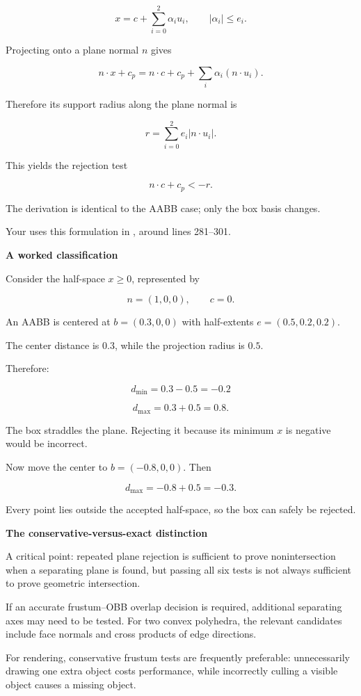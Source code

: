 \[
x=c+\sum_{i=0}^{2}\alpha_i u_i, \qquad|\alpha_i|\le e_i.
\]

Projecting onto a plane normal \(n\) gives

\[
n\cdot x+c_p = n\cdot c+c_p+ \sum_i\alpha_i(n\cdot u_i).
\]

Therefore its support radius along the plane normal is

\[
r=\sum_{i=0}^{2}e_i|n\cdot u_i|.
\]

This yields the rejection test

\[
n\cdot c+c_p<-r.
\]

The derivation is identical to the AABB case; only the box basis changes.

Your  uses this formulation in , around lines 281--301.

\textbf{A worked classification}

Consider the half-space \(x\ge0\), represented by

\[
n=(1,0,0),\qquad c=0.
\]

An AABB is centered at \(b=(0.3,0,0)\) with half-extents \(e=(0.5,0.2,0.2)\).

The center distance is \(0.3\), while the projection radius is \(0.5\).

Therefore:

\[
d_{\min}=0.3-0.5=-0.2
\]

\[
d_{\max}=0.3+0.5=0.8.
\]

The box straddles the plane. Rejecting it because its minimum \(x\) is negative would be incorrect.

Now move the center to \(b=(-0.8,0,0)\). Then

\[
d_{\max}=-0.8+0.5=-0.3.
\]

Every point lies outside the accepted half-space, so the box can safely be rejected.

\textbf{The conservative-versus-exact distinction}

A critical point: repeated plane rejection is sufficient to prove nonintersection when a separating plane is found, but passing all six tests is not always sufficient to prove geometric intersection.

If an accurate frustum--OBB overlap decision is required, additional separating axes may need to be tested. For two convex polyhedra, the relevant candidates include face normals and cross products of edge directions.

For rendering, conservative frustum tests are frequently preferable: unnecessarily drawing one extra object costs performance, while incorrectly culling a visible object causes a missing object.

